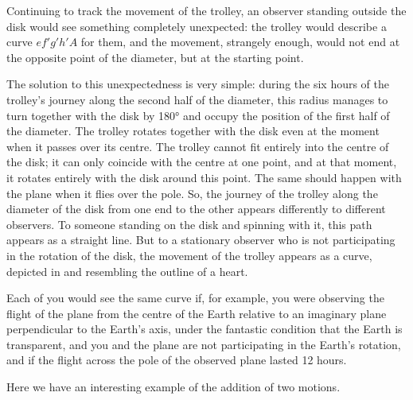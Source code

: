 Continuing to track the movement of the trolley, an observer standing outside the disk would see something completely unexpected: the trolley would describe a curve $ef'g'h'A$ for them, and the movement, strangely enough, would not end at the opposite point of the diameter, but at the starting point.

The solution to this unexpectedness is very simple: during the six hours of the trolley's journey along the second half of the diameter, this radius manages to turn together with the disk by \ang{180} and occupy the position of the first half of the diameter. The trolley rotates together with the disk even at the moment when it passes over its centre. The trolley cannot fit entirely into the centre of the disk; it can only coincide with the centre at one point, and at that moment, it rotates entirely with the disk around this point. The same should happen with the plane when it flies over the pole. So, the journey of the trolley along the diameter of the disk from one end to the other appears differently to different observers. To someone standing on the disk and spinning with it, this path appears as a straight line. But to a stationary observer who is not participating in the rotation of the disk, the movement of the trolley appears as a curve, depicted in  and resembling the outline of a heart.

Each of you would see the same curve if, for example, you were observing the flight of the plane from the centre of the Earth relative to an imaginary plane perpendicular to the Earth's axis, under the fantastic condition that the Earth is transparent, and you and the plane are not participating in the Earth's rotation, and if the flight across the pole of the observed plane lasted 12 hours.

Here we have an interesting example of the addition of two motions.

